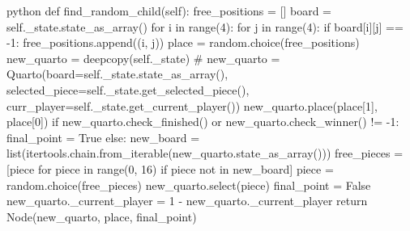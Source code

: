 \begin{mintedbox}{python}
    def find_random_child(self):
        free_positions = []
        board = self._state.state_as_array()
        for i in range(4):
            for j in range(4):
                if board[i][j] == -1:
                    free_positions.append((i, j))
        place = random.choice(free_positions)
        new_quarto = deepcopy(self._state)
        # new_quarto = Quarto(board=self._state.state_as_array(), selected_piece=self._state.get_selected_piece(), curr_player=self._state.get_current_player())
        new_quarto.place(place[1], place[0])
        if new_quarto.check_finished() or new_quarto.check_winner() != -1:
            final_point = True
        else:
            new_board = list(itertools.chain.from_iterable(new_quarto.state_as_array()))
            free_pieces = [piece for piece in range(0, 16) if piece not in new_board]
            piece = random.choice(free_pieces)
            new_quarto.select(piece)
            final_point = False
        new_quarto._current_player = 1 - new_quarto._current_player
        return Node(new_quarto, place, final_point)
\end{mintedbox}

